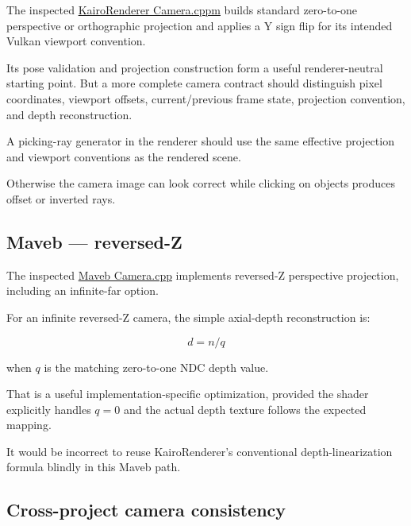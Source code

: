 The inspected \href{https://github.com/swayam8624/KairoRenderer/blob/main/Camera.cppm?utm_source=chatgpt.com}{KairoRenderer Camera.cppm} builds standard zero-to-one perspective or orthographic projection and applies a Y sign flip for its intended Vulkan viewport convention.

Its pose validation and projection construction form a useful renderer-neutral starting point. But a more complete camera contract should distinguish pixel coordinates, viewport offsets, current/previous frame state, projection convention, and depth reconstruction.

A picking-ray generator in the renderer should use the same effective projection and viewport conventions as the rendered scene.

Otherwise the camera image can look correct while clicking on objects produces offset or inverted rays.

\subsection{Maveb --- reversed-Z}\label{02-foundations-ii-ch037-maveb-reversed-z}

\hypertarget{02-foundations-ii-ch037-maveb-reversed-z}{}

The inspected \href{https://github.com/swayam8624/Maveb/blob/main/engine/scene/src/Camera.cpp?utm_source=chatgpt.com}{Maveb Camera.cpp} implements reversed-Z perspective projection, including an infinite-far option.

For an infinite reversed-Z camera, the simple axial-depth reconstruction is:

\[ \boxed{d=n/q} \]

when \(q\) is the matching zero-to-one NDC depth value.

That is a useful implementation-specific optimization, provided the shader explicitly handles \(q=0\) and the actual depth texture follows the expected mapping.

It would be incorrect to reuse KairoRenderer's conventional depth-linearization formula blindly in this Maveb path.

\subsection{Cross-project camera consistency}\label{02-foundations-ii-ch037-cross-project-camera-consistency}

\hypertarget{02-foundations-ii-ch037-cross-project-camera-consistency}{}

